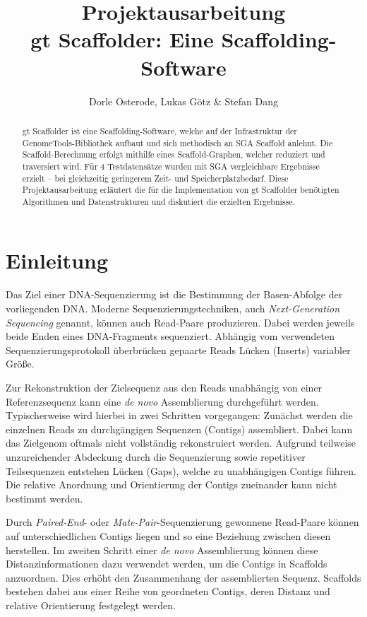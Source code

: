 \documentclass[a4paper,11pt,parskip,abstract=on]{scrartcl}
\title{Projektausarbeitung \\\vspace{.5cm} \large gt Scaffolder: Eine Scaffolding-Software}
\author{Dorle Osterode, Lukas Götz \& Stefan Dang}
\date{}
\begin{document}
\maketitle{}
\thispagestyle{empty}
\begin{abstract}
gt Scaffolder ist eine Scaffolding-Software, welche auf der Infrastruktur der
GenomeTools-Bibliothek aufbaut und sich methodisch an SGA Scaffold anlehnt.
Die Scaffold-Berechnung erfolgt mithilfe eines Scaffold-Graphen, welcher
reduziert und traversiert wird. Für 4 Testdatensätze wurden mit SGA
vergleichbare Ergebnisse erzielt -- bei gleichzeitig geringerem Zeit- und
Speicherplatzbedarf.
Diese Projektausarbeitung erläutert die für die Implementation
von gt Scaffolder benötigten Algorithmen und Datenstrukturen und diskutiert
die erzielten Ergebnisse.
\end{abstract}

\newpage{}
\thispagestyle{empty}
\tableofcontents{}
\newpage{}
\setcounter{page}{1}
\section{Einleitung}

Das Ziel einer DNA-Sequenzierung ist die Bestimmung der Basen-Abfolge
der vorliegenden DNA. Moderne Sequenzierungstechniken, auch
\textit{Next-Generation Sequencing} genannt, können auch Read-Paare
produzieren. Dabei werden jeweils beide Enden eines DNA-Fragments
sequenziert. Abhängig vom verwendeten Sequenzierungsprotokoll
überbrücken gepaarte Reads Lücken (Inserts) variabler Größe.

Zur Rekonstruktion der Zielsequenz aus den Reads unabhängig von einer
Referenzsequenz kann eine \textit{de novo} Assemblierung durchgeführt
werden. Typischerweise wird hierbei in zwei Schritten vorgegangen:
Zunächst werden die einzelnen Reads zu durchgängigen Sequenzen
(Contigs) assembliert. Dabei kann das Zielgenom oftmals nicht
vollständig rekonstruiert werden. Aufgrund teilweise unzureichender
Abdeckung durch die Sequenzierung sowie repetitiver Teilsequenzen
entstehen Lücken (Gaps), welche zu unabhängigen Contigs führen. Die
relative Anordnung und Orientierung der Contigs zueinander kann nicht
bestimmt werden.

Durch \textit{Paired-End}- oder \textit{Mate-Pair}-Sequenzierung
gewonnene Read-Paare können auf unterschiedlichen Contigs liegen und
so eine Beziehung zwischen diesen herstellen. Im zweiten Schritt einer
\textit{de novo} Assemblierung können diese Distanzinformationen dazu
verwendet werden, um die Contigs in Scaffolds anzuordnen. Dies erhöht
den Zusammenhang der assemblierten Sequenz. Scaffolds bestehen
dabei aus einer Reihe von geordneten Contigs, deren Distanz und
relative Orientierung festgelegt werden.
\end{document}

